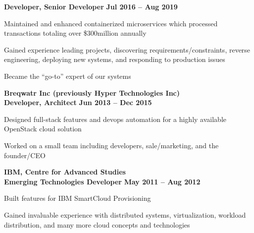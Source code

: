 \documentclass[margin,line]{resume}
\begin{document}
\begin{resume}
    \hspace{2.6mm}\textbf{Developer, Senior Developer} \hfill \textbf{Jul 2016 -- Aug 2019}\vspace{1mm}
    \begin{list2}
        \item Maintained and enhanced containerized microservices which processed transactions totaling over \$300million annually
        \vspace{1mm}
        \item Gained experience leading projects, discovering requirements/constraints, reverse engineering, deploying new systems, and responding to production issues
        \vspace{1mm}
        \item Became the “go-to” expert of our systems
    \end{list2}

    \hspace{-3mm}\textbf{\listing Breqwatr Inc (previously Hyper Technologies Inc)} \vspace{2mm}\\\vspace{1mm}
    \hspace{1.2mm}\textbf{Developer, Architect} \hfill \textbf{Jun 2013 -- Dec 2015}\vspace{1mm}
    \begin{list2}
        \item Designed full-stack features and devops automation for a highly available OpenStack cloud solution
        \vspace{1mm}
        \item Worked on a small team including developers, sale/marketing, and the founder/CEO
    \end{list2}

    \hspace{-3mm}\textbf{\listing IBM, Centre for Advanced Studies}\vspace{2mm}\\\vspace{1mm}
    \hspace{1.2mm}\textbf{Emerging Technologies Developer} \hfill \textbf{May 2011 -- Aug 2012}\vspace{1mm}
    \begin{list2}
        \item Built features for IBM SmartCloud Provisioning
        \vspace{1mm}
        \item Gained invaluable experience with distributed systems, virtualization, workload distribution, and many more cloud concepts and technologies
    \end{list2}


\end{resume}
\end{document}
